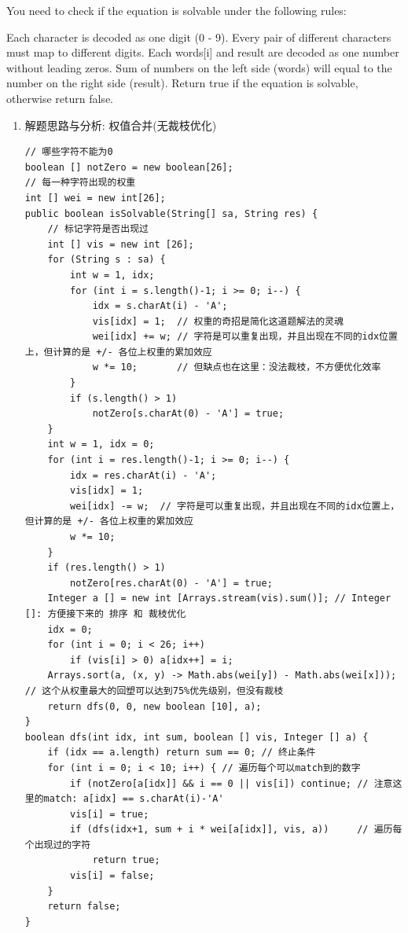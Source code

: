 \documentclass[9pt, b5paaper]{book}
\begin{document}
You need to check if the equation is solvable under the following rules:

Each character is decoded as one digit (0 - 9).
Every pair of different characters must map to different digits.
Each words[i] and result are decoded as one number without leading zeros.
Sum of numbers on the left side (words) will equal to the number on the right side (result).
Return true if the equation is solvable, otherwise return false.
\begin{enumerate}
\item 解题思路与分析: 权值合并(无裁枝优化)
\label{sec-8-0-3-1}
\begin{verbatim}
// 哪些字符不能为0
boolean [] notZero = new boolean[26];
// 每一种字符出现的权重
int [] wei = new int[26];
public boolean isSolvable(String[] sa, String res) {
    // 标记字符是否出现过
    int [] vis = new int [26];
    for (String s : sa) {
        int w = 1, idx;
        for (int i = s.length()-1; i >= 0; i--) {
            idx = s.charAt(i) - 'A';
            vis[idx] = 1;  // 权重的奇招是简化这道题解法的灵魂
            wei[idx] += w; // 字符是可以重复出现，并且出现在不同的idx位置上，但计算的是 +/- 各位上权重的累加效应
            w *= 10;       // 但缺点也在这里：没法裁枝，不方便优化效率 
        }
        if (s.length() > 1)
            notZero[s.charAt(0) - 'A'] = true;
    }
    int w = 1, idx = 0;
    for (int i = res.length()-1; i >= 0; i--) {
        idx = res.charAt(i) - 'A';
        vis[idx] = 1;
        wei[idx] -= w;  // 字符是可以重复出现，并且出现在不同的idx位置上，但计算的是 +/- 各位上权重的累加效应
        w *= 10;
    }
    if (res.length() > 1)
        notZero[res.charAt(0) - 'A'] = true;
    Integer a [] = new int [Arrays.stream(vis).sum()]; // Integer []: 方便接下来的 排序 和 裁枝优化
    idx = 0;
    for (int i = 0; i < 26; i++) 
        if (vis[i] > 0) a[idx++] = i;
    Arrays.sort(a, (x, y) -> Math.abs(wei[y]) - Math.abs(wei[x])); // 这个从权重最大的回塑可以达到75%优先级别，但没有裁枝
    return dfs(0, 0, new boolean [10], a);
}
boolean dfs(int idx, int sum, boolean [] vis, Integer [] a) {
    if (idx == a.length) return sum == 0; // 终止条件
    for (int i = 0; i < 10; i++) { // 遍历每个可以match到的数字
        if (notZero[a[idx]] && i == 0 || vis[i]) continue; // 注意这里的match: a[idx] == s.charAt(i)-'A'
        vis[i] = true;
        if (dfs(idx+1, sum + i * wei[a[idx]], vis, a))     // 遍历每个出现过的字符
            return true;
        vis[i] = false;
    }
    return false;
}
\end{verbatim}

\end{enumerate}
\end{document}
